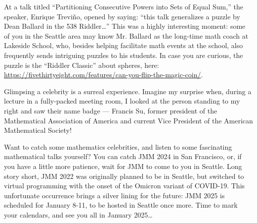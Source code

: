 \documentclass{article}
\begin{document}
At a talk titled “Partitioning Consecutive Powers into Sets of Equal Sum,” the speaker, Enrique Treviño, opened by saying: “this talk generalizes a puzzle by Dean Ballard in the 538 Riddler…” This was a highly interesting moment: some of you in the Seattle area may know Mr. Ballard as the long-time math coach at Lakeside School, who, besides helping facilitate math events at the school, also frequently sends intriguing puzzles to his students. In case you are curious, the puzzle is the “Riddler Classic” about spheres, here: \href{https://fivethirtyeight.com/features/can-you-flip-the-magic-coin/}{https://fivethirtyeight.com/features/can-you-flip-the-magic-coin/}. 

Glimpsing a celebrity is a surreal experience. Imagine my surprise when, during a lecture in a fully-packed meeting room, I looked at the person standing to my right and saw their name badge — Francis Su, former president of the Mathematical Association of America and current Vice President of the American Mathematical Society!

Want to catch some mathematics celebrities, and listen to some fascinating mathematical talks yourself? You can catch JMM 2024 in San Francisco, or, if you have a little more patience, wait for JMM to come to you in Seattle. Long story short, JMM 2022 was originally planned to be in Seattle, but switched to virtual programming with the onset of the Omicron variant of COVID-19. This unfortunate occurrence brings a silver lining for the future: JMM 2025 is scheduled for January 8-11, to be hosted in Seattle once more. Time to mark your calendars, and see you all in January 2025…
\end{document}
